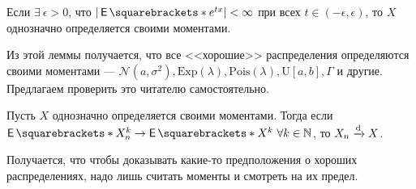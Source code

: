 \begin{lemma}
  Если $\exists \ \epsilon > 0$, что $|\E{e^{tx}}| < \infty$ при всех $t \in 
  (-\epsilon, \epsilon)$, то $X$ однозначно определяется своими моментами.
\end{lemma}

Из этой леммы получается, что все <<хорошие>> распределения определяются своими
моментами --- $\mathcal{N}(a, \sigma^2), \mathrm{Exp}(\lambda), \mathrm{Pois}(\lambda),
\mathrm{U}[a, b], \Gamma$ и другие. Предлагаем проверить это читателю самостоятельно.

\begin{lemma}
  Пусть $X$ однозначно определяется своими моментами. Тогда если 
  $\E{X_n^k} \to \E{X^k} \ \forall k \in \N$, то $X_n \xrightarrow{\mathrm{d}} X$.
\end{lemma}

Получается, что чтобы доказывать какие-то предположения о хороших распределениях,
надо лишь считать моменты и смотреть на их предел.

